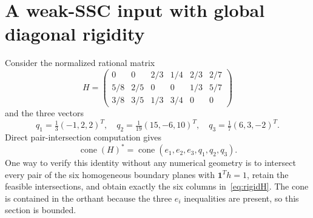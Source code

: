\documentclass[11pt]{article}
\theoremstyle{definition}\newtheorem{definition}[theorem]{Definition}
\newcommand{\e}{\mathbf1}\newcommand{\cone}{\operatorname{cone}}
\begin{document}
\section{A weak-SSC input with global diagonal rigidity}
\label{sec:rigidity}
Consider the normalized rational matrix
\begin{equation}
 H=\begin{pmatrix}
 0&0&2/3&1/4&2/3&2/7\\
 5/8&2/5&0&0&1/3&5/7\\
 3/8&3/5&1/3&3/4&0&0
 \end{pmatrix}
 \label{eq:rigidH}
\end{equation}
and the three vectors
\begin{equation}
 q_1=\tfrac13(-1,2,2)^T,\quad
 q_2=\tfrac1{19}(15,-6,10)^T,\quad
 q_3=\tfrac17(6,3,-2)^T.
 \label{eq:rigidq}
\end{equation}
Direct pair-intersection computation gives
\begin{equation}
 \cone(H)^*=\cone(e_1,e_2,e_3,q_1,q_2,q_3).
 \label{eq:rigiddual}
\end{equation}
One way to verify this identity without any numerical geometry is to intersect every pair of the six homogeneous boundary planes with $\e^Th=1$, retain the feasible intersections, and obtain exactly the six columns in~\eqref{eq:rigidH}. The cone is contained in the orthant because the three $e_i$ inequalities are present, so this section is bounded.
\end{document}
